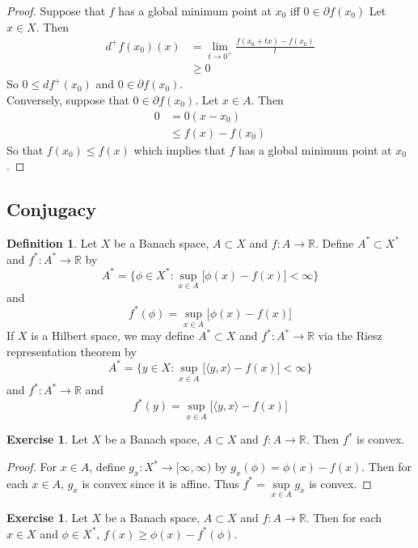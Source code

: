 \documentclass[12pt]{amsart}
\theoremstyle{definition}
\newtheorem{defn}[definition]{Definition}
\theoremstyle{remark}
\theoremstyle{definition}
\newtheorem{ex}[definition]{Exercise}
\newcommand{\R}{\mathbb{R}}
\newcommand{\p}{\partial}
\renewcommand{\r}{\rangle}
\renewcommand{\l}{\langle}
\newcommand{\Rd}{[\infty, \infty)}
\begin{document}
	\begin{proof}
	Suppose that $f$ has a global minimum point at $x_0$ iff $0 \in \p f(x_0)$ Let $x \in X$. Then 
	\begin{align*}
	d^+f(x_0)(x) 
	&= \lim_{t \rightarrow 0^+} \frac{f(x_0 + tx) - f(x_0)}{t} \\
	& \geq 0
	\end{align*}
	So $0 \leq df^+(x_0)$ and $0 \in \p f(x_0)$.\\
	Conversely, suppose that $0 \in \p f(x_0)$. Let $x \in A$. Then 
	\begin{align*}
	0
	& = 0(x - x_0) \\
	& \leq f(x) - f(x_0)
	\end{align*}
	So that $f(x_0) \leq f(x)$ which implies that $f$ has a global minimum point at $x_0$.
	\end{proof}
	
	
	
	\newpage 
	\subsection{Conjugacy}
	
	\begin{defn}
	Let $X$ be a Banach space, $A \subset X$ and $f:A \rightarrow \R$. Define $A^* \subset X^*$ and $f^*: A^* \rightarrow \R$ by $$A^* = \bigg \{\phi \in X^*: \sup_{x \in A} \bigg[ \phi(x) - f(x) \bigg] < \infty \bigg  \}$$ and $$f^*(\phi) = \sup_{x \in A} \bigg[ \phi(x) - f(x) \bigg] $$ 
	If $X$ is a Hilbert space, we may define $A^* \subset X$ and $f^*: A^* \rightarrow \R$ via the Riesz representation theorem by $$A^* = \bigg \{y \in X: \sup_{x \in A} \bigg[ \l y, x \r - f(x) \bigg] < \infty \bigg  \}$$ and $f^*: A^* \rightarrow \R$ and $$ f^*(y) = \sup_{x \in A} \bigg[ \l y, x \r - f(x) \bigg] $$
	\end{defn} 
	
	\begin{ex}
	Let $X$ be a Banach space, $A \subset X$ and $f:A \rightarrow \R$. Then $f^*$ is convex. 
	\end{ex}
	
	\begin{proof}
		For $x \in A$, define $g_x: X^* \rightarrow \Rd$ by $g_x(\phi) = \phi(x) - f(x)$. Then for each $x \in A$, $g_x$ is convex since it is affine. Thus $f^* = \sup\limits_{x \in A} g_x$		 
is convex.  
	\end{proof}
	
	\begin{ex}
		Let $X$ be a Banach space, $A \subset X$ and $f:A \rightarrow \R$. Then for each $x \in X$ and $\phi \in X^*$, $f(x) \geq \phi(x) - f^*(\phi)$.	
	\end{ex}
	
\end{document}
